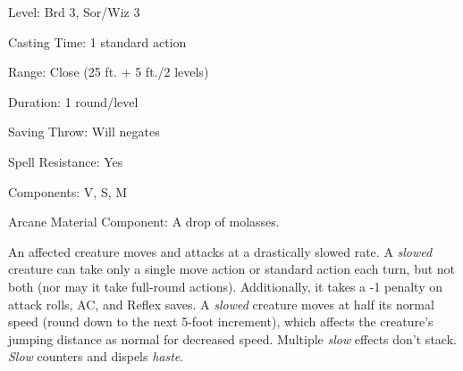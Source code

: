 
\begin{description*}
\item[Level:] Brd 3, Sor/Wiz 3
\item[Casting Time:] 1 standard action
\item[Range:] Close (25 ft. + 5 ft./2 levels)
\item[Duration:] 1 round/level
\item[Saving Throw:] Will negates
\item[Spell Resistance:] Yes
\item[Components:] V, S, M
\item[Arcane Material Component:] A drop of molasses.
\end{description*}

An affected creature moves and attacks at a drastically slowed rate. A \textit{slowed
}creature can take only a single move action or standard action each turn, but
not both (nor may it take full-round actions). Additionally, it takes a -1 penalty
on attack rolls, AC, and Reflex saves. A \textit{slowed} creature moves at half
its normal speed (round down to the next 5-foot increment), which affects the creature's
jumping distance as normal for decreased speed.
Multiple \textit{slow} effects don't stack. \textit{Slow} counters and dispels
\textit{haste}.